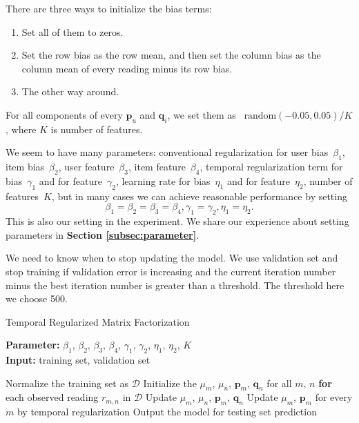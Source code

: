 
There are three ways to initialize the bias terms:
\begin{enumerate}
	\setlength {\itemsep}{-5pt}
	\item Set all of them to zeros.
	\item Set the row bias as the row mean, and then set the column bias as the column mean of every reading minus its row bias.
	\item The other way around.
\end{enumerate}
For all components of every $\mathbf{p}_{u}$ and $\mathbf{q}_{i}$, we set them as ~$\mbox{random}(-0.05,0.05)/K$, where $K$ is number of features.


We seem to have many parameters: conventional regularization for user bias~$\beta_1$, item bias~$\beta_2$, user feature~$\beta_3$, item feature~$\beta_4$, temporal regularization term for bias~$\gamma_1$ and for feature~$\gamma_2$, learning rate for bias~$\eta_1$ and for feature~$\eta_2$, number of features~$K$, but in many cases we can achieve reasonable performance by setting 
\begin{equation*}\beta_1 = \beta_2 = \beta_3 = \beta_4, \gamma_1 = \gamma_2, \eta_1 = \eta_2. \end{equation*}
This is also our setting in the experiment. We share our experience about setting parameters in \textbf{Section \ref{subsec:parameter}}.


We need to know when to stop updating the model. We use validation set and stop training if validation error is increasing and the current iteration number minus the best iteration number is greater than a threshold.  The threshold here we choose 500. 

\begin{algorithm}
	\caption{Temporal Regularized Matrix Factorization}
	\label{alg:TRMF}
	\textbf{Parameter:} $\beta_1$, $\beta_2$, $\beta_3$, $\beta_4$, $\gamma_1$, $\gamma_2$, $\eta_1$, $\eta_2$, $K$\\
	\textbf{Input:} training set, validation set
	\begin{algorithmic}
		\State Normalize the training set as $\mathcal{D}$
		\State Initialize the $\mu_m$, $\mu_n$, $\mathbf{p}_m$, $\mathbf{q}_n$ for all $m$, $n$
		\Repeat
			\State \textbf{for} each observed reading $r_{m,n}$ in $\mathcal{D}$
				\State \indent Update $\mu_m$, $\mu_n$, $\mathbf{p}_{m}$, $\mathbf{q}_{n}$
			\State Update $\mu_m$, $\mathbf{p}_m$ for every $m$ by temporal regularization
		\State Output the model for testing set prediction
	\end{algorithmic}
\end{algorithm}


